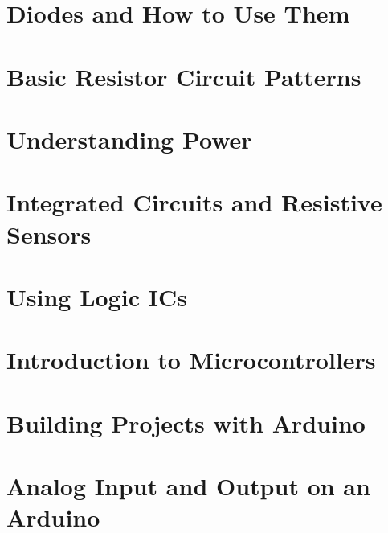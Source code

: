 \documentclass[twocolumn]{book}
\begin{document}


\chapter{Diodes and How to Use Them}



\chapter{Basic Resistor Circuit Patterns}



\chapter{Understanding Power}



\chapter{Integrated Circuits and Resistive Sensors}



\chapter{Using Logic ICs}



\chapter{Introduction to Microcontrollers}



\chapter{Building Projects with Arduino}



\chapter{Analog Input and Output on an Arduino}


\end{document}
